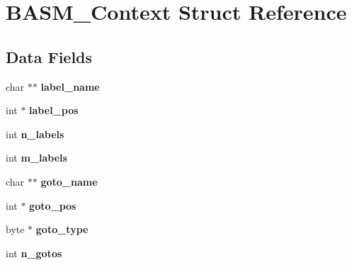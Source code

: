 \hypertarget{structBASM__Context}{\section{B\-A\-S\-M\-\_\-\-Context Struct Reference}
\label{structBASM__Context}
}
\subsection*{Data Fields}
\begin{DoxyCompactItemize}
\item 
\hypertarget{structBASM__Context_a7f6a91bdd9874fd5b4f4bf56852ba851}{char $\ast$$\ast$ {\bfseries label\-\_\-name}}\label{structBASM__Context_a7f6a91bdd9874fd5b4f4bf56852ba851}

\item 
\hypertarget{structBASM__Context_a0e596b1e5439fb38a5abf501b311d0ec}{int $\ast$ {\bfseries label\-\_\-pos}}\label{structBASM__Context_a0e596b1e5439fb38a5abf501b311d0ec}

\item 
\hypertarget{structBASM__Context_a0907d6627e26f73a116a9a433a43bc72}{int {\bfseries n\-\_\-labels}}\label{structBASM__Context_a0907d6627e26f73a116a9a433a43bc72}

\item 
\hypertarget{structBASM__Context_a8c066e7a0844541455b02fddf01f649c}{int {\bfseries m\-\_\-labels}}\label{structBASM__Context_a8c066e7a0844541455b02fddf01f649c}

\item 
\hypertarget{structBASM__Context_ad53071fa4505db09ade8e6f86ed7f8c4}{char $\ast$$\ast$ {\bfseries goto\-\_\-name}}\label{structBASM__Context_ad53071fa4505db09ade8e6f86ed7f8c4}

\item 
\hypertarget{structBASM__Context_aec21c2e956f0e8651fbe35101945aff0}{int $\ast$ {\bfseries goto\-\_\-pos}}\label{structBASM__Context_aec21c2e956f0e8651fbe35101945aff0}

\item 
\hypertarget{structBASM__Context_a95685b60e4a4c8f5a23d85c2ce88e2ef}{byte $\ast$ {\bfseries goto\-\_\-type}}\label{structBASM__Context_a95685b60e4a4c8f5a23d85c2ce88e2ef}

\item 
\hypertarget{structBASM__Context_a2240a182b611e420a472e04160a13fa5}{int {\bfseries n\-\_\-gotos}}\label{structBASM__Context_a2240a182b611e420a472e04160a13fa5}


\end{DoxyCompactItemize}
